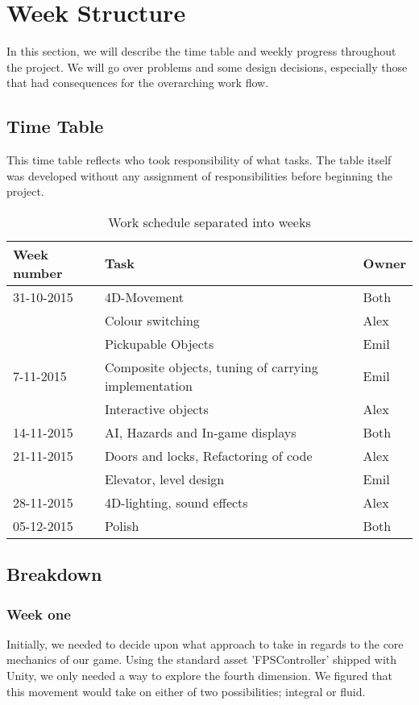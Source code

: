 \section{Week Structure}
In this section, we will describe the time table and weekly progress throughout the project. We will go over problems and some design decisions, especially those that had consequences for the overarching work flow.
\subsection{Time Table}
This time table reflects who took responsibility of what tasks. The table itself was developed without any assignment of responsibilities before beginning the project.
\begin{table}[h]
	\begin{tabular}{|l|l|l|}
		\hline
		Week number & Task & Owner\\
		\hline
		31-10-2015 & 4D-Movement & Both\\ 
		& Colour switching & Alex\\
		& Pickupable Objects & Emil\\
		\hline
		7-11-2015 & Composite objects, tuning of carrying implementation & Emil\\
		& Interactive objects & Alex\\
		\hline
		14-11-2015 & AI, Hazards and In-game displays & Both\\
		\hline
		21-11-2015 & Doors and locks, Refactoring of code & Alex\\
		& Elevator, level design & Emil\\
		\hline
		28-11-2015 & 4D-lighting, sound effects & Alex\\
		\hline
		05-12-2015 & Polish & Both\\
		\hline
	\end{tabular}
	\caption{Work schedule separated into weeks}
	\label{tabWeek}
\end{table}

\subsection{Breakdown}
\subsubsection{Week one}
Initially, we needed to decide upon what approach to take in regards to the core mechanics of our game. Using the standard asset 'FPSController' shipped with Unity, we only needed a way to explore the fourth dimension. We figured that this movement would take on either of two possibilities; integral or fluid.\\

